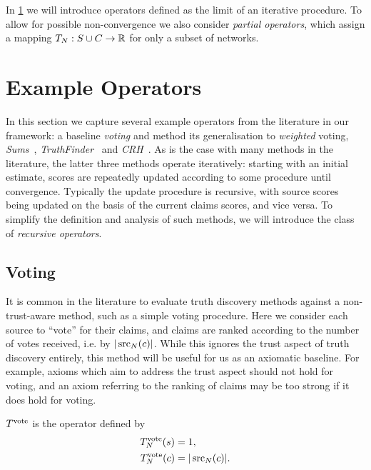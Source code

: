 In \cref{td_new_sec_example_operators} we will introduce operators defined as
the limit of an iterative procedure. To allow for possible non-convergence we
also consider \emph{partial operators}, which assign a mapping $T_N: S \cup C
\to \mathbb{R}$ for only a subset of networks.

\section{Example Operators}
\label{td_new_sec_example_operators}

In this section we capture several example operators from the literature in our
framework: a baseline \emph{voting} and method its generalisation to
\emph{weighted} voting, \emph{Sums}~\cite{pasternack2010},
\emph{TruthFinder}~\cite{yin2008} and \emph{CRH}~\cite{li2016}. As is the case
with many methods in the literature, the latter three methods operate
iteratively: starting with an initial estimate, scores are repeatedly updated
according to some procedure until convergence. Typically the update procedure
is recursive, with source scores being updated on the basis of the current
claims scores, and vice versa.  To simplify the definition and analysis of such
methods, we will introduce the class of \emph{recursive operators}.

\subsection{Voting}
\label{td_new_sec_voting}

It is common in the literature to evaluate truth discovery methods against a
non-trust-aware method, such as a simple voting procedure.\footnotemark{} Here
we consider each source to ``vote'' for their claims, and claims are ranked
according to the number of votes received, i.e. by $|\operatorname{src}_N(c)|$. While this
ignores the trust aspect of truth discovery entirely, this method will be
useful for us as an axiomatic baseline. For example, axioms which aim to
address the trust aspect should not hold for voting, and an axiom referring to
the ranking of claims may be too strong if it does hold for voting.


\begin{definition}
    $T^{\operatorname{vote}}$ is the operator defined by
    \begin{align*}
        T^{\operatorname{vote}}_N(s) &= 1,\\
        T^{\operatorname{vote}}_N(c) &= |\operatorname{src}_N(c)|.
    \end{align*}
\end{definition}

